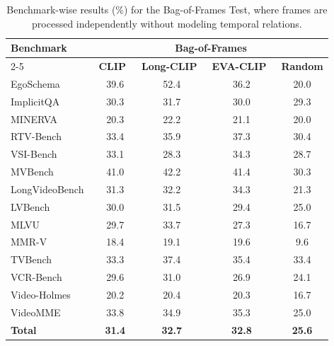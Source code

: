         
        \begin{table}[h]
        \centering
        \caption{Benchmark-wise results (\%) for the Bag-of-Frames Test, where frames are processed independently without modeling temporal relations.}
        \footnotesize
        \setlength{\tabcolsep}{4pt}
        \begin{tabular}{lcccc}
        \toprule
        \multirow{2}{*}{\textbf{Benchmark}} & \multicolumn{4}{c}{\scriptsize \textbf{Bag-of-Frames}} \\
        \cmidrule(lr){2-5}
         & {\scriptsize \textbf{CLIP~\cite{clip}}} & {\scriptsize \textbf{Long-CLIP}~\cite{longclip}} & {\scriptsize \textbf{EVA-CLIP}~\cite{evaclip}} & {\scriptsize \textbf{Random}} \\
        \midrule
        EgoSchema~\cite{egoschema} & 39.6 & 52.4 & 36.2 & 20.0 \\
        ImplicitQA~\cite{implicitqa} & 30.3 & 31.7 & 30.0 & 29.3 \\
        MINERVA~\cite{minerva} & 20.3 & 22.2 & 21.1 & 20.0 \\
        RTV-Bench~\cite{rtvbench} & 33.4 & 35.9 & 37.3 & 30.4 \\
        VSI-Bench~\cite{vsibench} & 33.1 & 28.3 & 34.3 & 28.7 \\
        MVBench~\cite{mvbench} & 41.0 & 42.2 & 41.4 & 30.3 \\
        LongVideoBench~\cite{longvideobench} & 31.3 & 32.2 & 34.3 & 21.3 \\
        LVBench~\cite{lvbench} & 30.0 & 31.5 & 29.4 & 25.0 \\
        MLVU~\cite{mlvu} & 29.7 & 33.7 & 27.3 & 16.7 \\
        MMR-V~\cite{mmrv} & 18.4 & 19.1 & 19.6 & 9.6 \\
        TVBench~\cite{tvbench} & 33.3 & 37.4 & 35.4 & 33.4 \\
        VCR-Bench~\cite{vcrbench} & 29.6 & 31.0 & 26.9 & 24.1 \\
        Video-Holmes~\cite{videoholmes} & 20.2 & 20.4 & 20.3 & 16.7 \\
        VideoMME~\cite{videomme} & 33.8 & 34.9 & 35.3 & 25.0 \\
        \midrule
        \textbf{Total} & \textbf{31.4} & \textbf{32.7} & \textbf{32.8} & \textbf{25.6} \\
        \bottomrule
        \end{tabular}
        \label{tab:bof}
        \end{table}
    \clearpage


